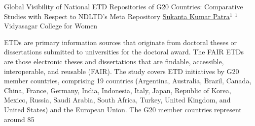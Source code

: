 \begin{abstract_online}{Global Visibility of National ETD Repositories of G20 Countries: Comparative Studies with Respect to NDLTD’s Meta Repository}{%
    \underline{Sukanta Kumar Patra}$^{1}$}{%
    }{%
    $^1$Vidyasagar College for Women\newline{}
}

ETDs are primary information sources that originate from doctoral theses or dissertations submitted to universities for the doctoral award. The FAIR ETDs are those electronic theses and dissertations that are findable, accessible, interoperable, and reusable (FAIR). The study covers ETD initiatives by G20 member countries, comprising 19 countries (Argentina, Australia, Brazil, Canada, China, France, Germany, India, Indonesia, Italy, Japan, Republic of Korea, Mexico, Russia, Saudi Arabia, South Africa, Turkey, United Kingdom, and United States) and the European Union. The G20 member countries represent around 85%

\end{abstract_online}

